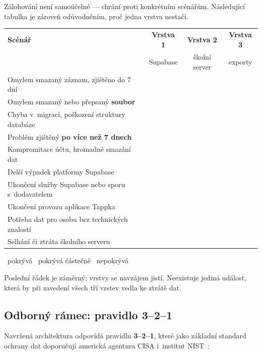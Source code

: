 \documentclass[11pt,a4paper]{article}
\newcommand{\ano}{\textcolor{accent}{\ding{51}}}
\newcommand{\nepokr}{\textcolor{warnln}{\ding{55}}}
\newcommand{\castecne}{\textcolor{muted}{\ding{108}}}
\begin{document}
Zálohování není samoúčelné --- chrání proti konkrétním scénářům. Následující tabulka je zároveň
odůvodněním, proč jedna vrstva nestačí.

\begin{center}
\begin{tabularx}{\textwidth}{@{}Xccc@{}}
\toprule
\textbf{Scénář} & \textbf{Vrstva 1} & \textbf{Vrstva 2} & \textbf{Vrstva 3} \\
 & {\footnotesize Supabase} & {\footnotesize školní server} & {\footnotesize exporty} \\
\midrule
Omylem smazaný záznam, zjištěno do 7 dní & \ano & \ano & \castecne \\
Omylem smazaný nebo přepsaný \textbf{soubor} & \nepokr & \ano & \ano \\
Chyba v~migraci, poškození struktury databáze & \ano & \ano & \nepokr \\
Problém zjištěný \textbf{po více než 7 dnech} & \nepokr & \ano & \ano \\
Kompromitace účtu, hromadné smazání dat & \castecne & \ano & \ano \\
Delší výpadek platformy Supabase & \nepokr & \ano & \ano \\
Ukončení služby Supabase nebo sporu s~dodavatelem & \nepokr & \ano & \ano \\
Ukončení provozu aplikace Tappka & \nepokr & \castecne & \ano \\
Potřeba dat pro osobu bez technických znalostí & \nepokr & \nepokr & \ano \\
Selhání či ztráta školního serveru & \ano & \nepokr & \castecne \\
\bottomrule
\end{tabularx}
\end{center}

\medskip
\noindent\small
\ano{}~pokrývá \quad \castecne{}~pokrývá částečně \quad \nepokr{}~nepokrývá
\normalsize

\medskip
Poslední řádek je záměrný: vrstvy se navzájem jistí. Neexistuje jediná událost, která by při
zavedení všech tří vrstev vedla ke ztrátě dat.

\subsection{Odborný rámec: pravidlo 3--2--1}

Navržená architektura odpovídá pravidlu \textbf{3--2--1}, které jako základní standard ochrany dat
doporučují americká agentura CISA i~institut NIST~\cite{pravidlo321}:
\end{document}
